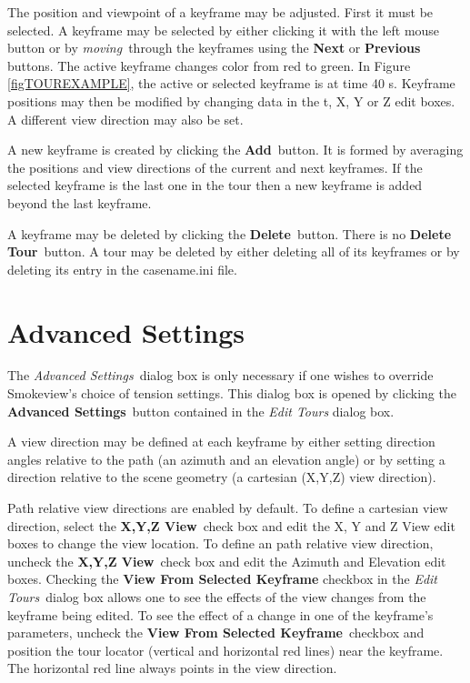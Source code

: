 \documentclass[11pt,twoside]{book}
\begin{document}
The position and viewpoint of a keyframe may be adjusted.  First it must be selected.  A keyframe may be selected by either clicking it with
the left mouse button or by {\em moving}\ through the keyframes using the {\bf Next} or {\bf Previous} buttons.  The active keyframe changes color from red to green.  In Figure \ref{figTOUREXAMPLE}, the active or selected keyframe is at time 40 s.
Keyframe positions may then be modified by changing data in the t,
X, Y or Z edit boxes. A different view direction may also be set.

A new keyframe is created by clicking the {\bf Add}\ button. It is
formed by averaging the positions and view directions of the
current and next keyframes. If the selected keyframe is the last
one in the tour then a new keyframe  is added beyond the last
keyframe.

A keyframe may be deleted by clicking the {\bf Delete}\ button.
There is no {\bf Delete Tour}\ button. A tour may be deleted by
either deleting all of its keyframes or by deleting its entry in
the casename.ini file.

\section{Advanced Settings}
The {\em Advanced Settings}\ dialog box is only necessary if one
wishes to override Smokeview's choice of tension settings.  This dialog box is
opened by clicking the {\bf Advanced Settings}\ button contained
in the {\em Edit Tours} dialog box.

A view direction may be defined at each keyframe by either setting
direction angles relative to the path (an azimuth and an elevation
angle) or by setting a direction relative to the scene geometry (a
cartesian (X,Y,Z) view direction).

Path relative view directions are enabled by default.  To define a
cartesian view direction, select the {\bf X,Y,Z View}\ check box
and edit the X, Y and Z View edit boxes to change the view
location. To define an path relative view direction, uncheck the
{\bf X,Y,Z View}\ check box and edit the Azimuth and Elevation
edit boxes. Checking the {\bf View From Selected Keyframe}
checkbox in the {\em Edit Tours}\ dialog box allows one to see the effects of the  view changes
from the keyframe being edited. To see the effect of a change in
one of the keyframe's parameters, uncheck the {\bf View From
Selected Keyframe}\ checkbox and position the tour locator
(vertical and horizontal red lines) near the keyframe.  The
horizontal red line always points in the view direction.
\end{document}
